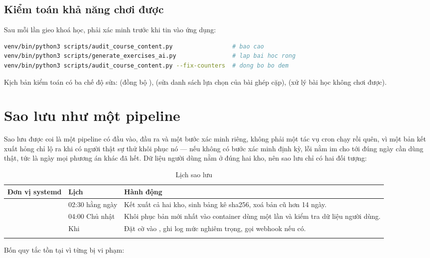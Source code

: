 \subsection{Kiểm toán khả năng chơi được}

Sau mỗi lần gieo khoá học, phải xác minh trước khi tin vào ứng dụng:

\begin{lstlisting}[language=bash]
venv/bin/python3 scripts/audit_course_content.py                 # bao cao
venv/bin/python3 scripts/generate_exercises_ai.py                # lap bai hoc rong
venv/bin/python3 scripts/audit_course_content.py --fix-counters  # dong bo bo dem
\end{lstlisting}

Kịch bản kiểm toán có ba chế độ sửa:  (đồng bộ
),  (sửa danh sách lựa chọn của bài ghép cặp),
 (xử lý bài học không chơi được).

\section{Sao lưu như một pipeline}

Sao lưu được coi là một pipeline có đầu vào, đầu ra và một bước xác minh riêng, không phải
một tác vụ cron chạy rồi quên, vì một bản kết xuất hỏng chỉ lộ ra khi có người thật sự thử
khôi phục nó — nếu không có bước xác minh định kỳ, lỗi nằm im cho tới đúng ngày cần dùng
thật, tức là ngày mọi phương án khác đã hết. Dữ liệu người dùng nằm ở đúng hai kho, nên sao
lưu chỉ có hai đối tượng:

\begin{longtable}{L{5.0cm} L{3.0cm} L{5.6cm}}
\toprule
\textbf{Đơn vị systemd} & \textbf{Lịch} & \textbf{Hành động}\\
\midrule
\endhead
{} & 02:30 hằng ngày & Kết xuất cả hai kho, sinh bảng kê sha256, xoá bản cũ hơn 14 ngày.\\
 & 04:00 Chủ nhật & Khôi phục bản mới nhất vào container dùng một lần và kiểm tra dữ liệu người dùng.\\
 & Khi  & Đặt cờ vào , ghi log mức nghiêm trọng, gọi webhook nếu có.\\
\bottomrule
\caption{Lịch sao lưu}
\end{longtable}

Bốn quy tắc tồn tại vì từng bị vi phạm:

